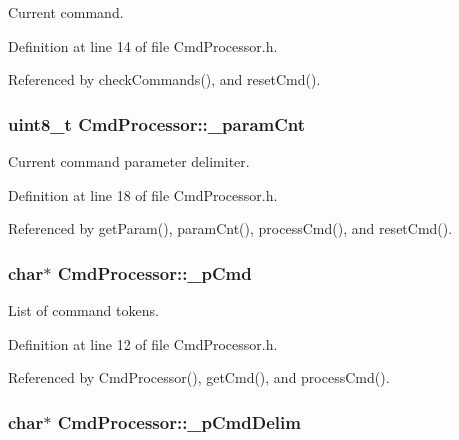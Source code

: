 Current command. 



Definition at line 14 of file CmdProcessor.h.



Referenced by checkCommands(), and resetCmd().

\hypertarget{class_cmd_processor_aff0622d6e4fca6bf1352392936d6c5ea}{
\subsubsection[{\_\-paramCnt}]{\setlength{\rightskip}{0pt plus 5cm}uint8\_\-t {\bf CmdProcessor::\_\-paramCnt}}}
\label{class_cmd_processor_aff0622d6e4fca6bf1352392936d6c5ea}


Current command parameter delimiter. 



Definition at line 18 of file CmdProcessor.h.



Referenced by getParam(), paramCnt(), processCmd(), and resetCmd().

\hypertarget{class_cmd_processor_a2017c885b275984549385ba246ec37f5}{
\subsubsection[{\_\-pCmd}]{\setlength{\rightskip}{0pt plus 5cm}char$\ast$ {\bf CmdProcessor::\_\-pCmd}}}
\label{class_cmd_processor_a2017c885b275984549385ba246ec37f5}


List of command tokens. 



Definition at line 12 of file CmdProcessor.h.



Referenced by CmdProcessor(), getCmd(), and processCmd().

\hypertarget{class_cmd_processor_a0f926649b612897af1cbee71d6a1a90a}{
\subsubsection[{\_\-pCmdDelim}]{\setlength{\rightskip}{0pt plus 5cm}char$\ast$ {\bf CmdProcessor::\_\-pCmdDelim}}}
\label{class_cmd_processor_a0f926649b612897af1cbee71d6a1a90a}


